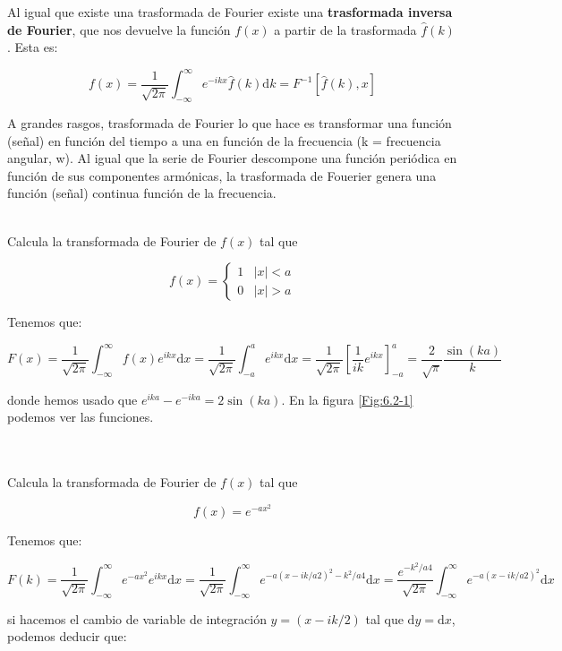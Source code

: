 \documentclass[12pt]{book}
\newcommand{\D}{\mathrm{d}}
\newcommand{\inti}{\int_{-\infty}^{\infty}}
\newcommand{\hatf}{\widehat{f}}
\begin{document}
Al igual que existe una trasformada de Fourier existe una \textbf{trasformada inversa de Fourier}, que nos devuelve la función $f(x)$ a partir de la trasformada $\hatf(k)$. Esta es:

\begin{equation}
f(x) = \dfrac{1}{\sqrt{2 \pi}} \inti e^{-ikx} \hatf (k) \D k = F^{-1}[\hatf (k),x]
\end{equation}

A grandes rasgos, trasformada de Fourier lo que hace es transformar una función (señal) en función del tiempo a una en función de la frecuencia (k = frecuencia angular, w). Al igual que la serie de Fourier descompone una función periódica en función de sus componentes armónicas, la trasformada de Fouerier genera una función (señal) continua función de la frecuencia.\\



\hrulefill \\


Calcula la transformada de Fourier de $f(x)$ tal que

$$ f(x) = \left\lbrace \begin{array}{ll}
1 & |x|<a \\
0 & |x|>a 
\end{array} \right. $$

Tenemos que:

$$ F(x) = \dfrac{1}{\sqrt{2 \pi}} \inti f(x) e^{ikx} \D x =  \dfrac{1}{\sqrt{2 \pi}} \int_{-a}^a  e^{ikx} \D x =   \dfrac{1}{\sqrt{2 \pi}} \left[ \dfrac{1}{ik} e^{ikx} \right]_{-a}^a = \dfrac{2}{\sqrt{\pi}}  \dfrac{\sin (ka)}{k}  $$

donde hemos usado que $e^{ika}-e^{-ika} = 2 \sin(ka)$. En la figura \ref{Fig:6.2-1} podemos ver las funciones.

\hrulefill \\

\hrulefill \\


Calcula la transformada de Fourier de $f(x)$ tal que

$$ f(x) = e^{-ax^2}$$

Tenemos que:

$$ F(k) = \dfrac{1}{\sqrt{2 \pi}} \inti e^{-ax^2} e^{ikx} \D x =  \dfrac{1}{\sqrt{2 \pi}} \inti e^{-a(x-ik/a2)^2 - k^2/a4} \D x =  \dfrac{e^{-k^2/a4}}{\sqrt{2 \pi}} \inti e^{-a(x-ik/a2)^2} \D x $$

si hacemos el cambio de variable de integración $y = (x-ik/2)$ tal que $\D y = \D x$, podemos deducir que:
\end{document}
